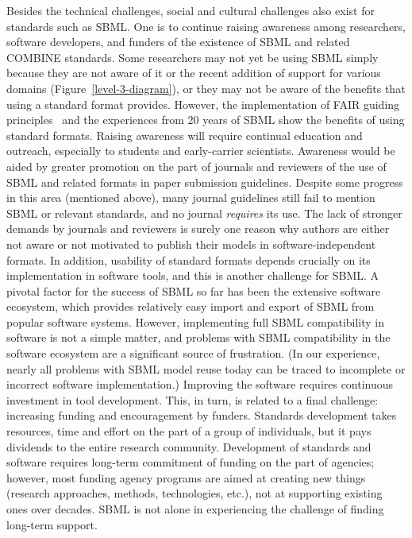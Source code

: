 \documentclass{sbml-paper}
\begin{document}
Besides the technical challenges, social and cultural challenges also exist for standards such as SBML.  One is to continue raising awareness among researchers, software developers, and funders of the existence of SBML and related COMBINE standards.  Some researchers may not yet be using SBML simply because they are not aware of it or the recent addition of support for various domains (Figure~\ref{level-3-diagram}), or they may not be aware of the benefits that using a standard format provides.  However, the implementation of FAIR guiding principles~\citep{wilkinson2016fair} and the experiences from 20 years of SBML show the benefits of using standard formats.  Raising awareness will require continual education and outreach, especially to students and early-carrier scientists.  Awareness would be aided by greater promotion on the part of journals and reviewers of the use of SBML and related formats in paper submission guidelines.  Despite some progress in this area (mentioned above), many journal guidelines still fail to mention SBML or relevant standards, and no journal \emph{requires} its use.  The lack of stronger demands by journals and reviewers is surely one reason why authors are either not aware or not motivated to publish their models in software-independent formats.  In addition, usability of standard formats depends crucially on its implementation in software tools, and this is another challenge for SBML.  A pivotal factor for the success of SBML so far has been the extensive software ecosystem, which provides relatively easy import and export of SBML from popular software systems.  However, implementing full SBML compatibility in software is not a simple matter, and problems with SBML compatibility in the software ecosystem are a significant source of frustration.  (In our experience, nearly all problems with SBML model reuse today can be traced to incomplete or incorrect software implementation.)  Improving the software requires continuous investment in tool development. This, in turn, is related to a final challenge: increasing funding and encouragement by funders.  Standards development takes resources, time and effort on the part of a group of individuals, but it pays dividends to the entire research community.  Development of standards and software requires long-term commitment of funding on the part of agencies; however, most funding agency programs are aimed at creating new things (research approaches, methods, technologies, etc.), not at supporting existing ones over decades.  SBML is not alone in experiencing the challenge of finding long-term support.
\end{document}
